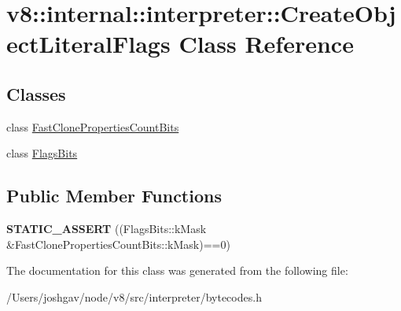 \hypertarget{classv8_1_1internal_1_1interpreter_1_1_create_object_literal_flags}{}\section{v8\+:\+:internal\+:\+:interpreter\+:\+:Create\+Object\+Literal\+Flags Class Reference}
\label{classv8_1_1internal_1_1interpreter_1_1_create_object_literal_flags}
\subsection*{Classes}
\begin{DoxyCompactItemize}
\item 
class \hyperlink{classv8_1_1internal_1_1interpreter_1_1_create_object_literal_flags_1_1_fast_clone_properties_count_bits}{Fast\+Clone\+Properties\+Count\+Bits}
\item 
class \hyperlink{classv8_1_1internal_1_1interpreter_1_1_create_object_literal_flags_1_1_flags_bits}{Flags\+Bits}
\end{DoxyCompactItemize}
\subsection*{Public Member Functions}
\begin{DoxyCompactItemize}
\item 
{\bfseries S\+T\+A\+T\+I\+C\+\_\+\+A\+S\+S\+E\+RT} ((Flags\+Bits\+::k\+Mask \&Fast\+Clone\+Properties\+Count\+Bits\+::k\+Mask)==0)\hypertarget{classv8_1_1internal_1_1interpreter_1_1_create_object_literal_flags_abf526e042eb703e43f0ce9e14b58ddcf}{}\label{classv8_1_1internal_1_1interpreter_1_1_create_object_literal_flags_abf526e042eb703e43f0ce9e14b58ddcf}

\end{DoxyCompactItemize}


The documentation for this class was generated from the following file\+:\begin{DoxyCompactItemize}
\item 
/\+Users/joshgav/node/v8/src/interpreter/bytecodes.\+h\end{DoxyCompactItemize}
